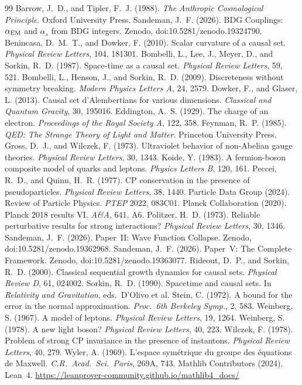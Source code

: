 \documentclass[12pt,a4paper]{article}
\begin{document}

\begin{thebibliography}{99}
 Barrow, J.~D., and Tipler, F.~J. (1988). \textit{The Anthropic Cosmological Principle}. Oxford University Press.
 Sandeman, J.~F. (2026). BDG Couplings: $\alpha_{\rm EM}$ and $\alpha_s$ from BDG integers. Zenodo, doi:10.5281/zenodo.19324790.
 Benincasa, D.~M.~T., and Dowker, F. (2010). Scalar curvature of a causal set. \textit{Physical Review Letters}, 104, 181301.
 Bombelli, L., Lee, J., Meyer, D., and Sorkin, R.~D. (1987). Space-time as a causal set. \textit{Physical Review Letters}, 59, 521.
 Bombelli, L., Henson, J., and Sorkin, R.~D. (2009). Discreteness without symmetry breaking. \textit{Modern Physics Letters A}, 24, 2579.
 Dowker, F., and Glaser, L. (2013). Causal set d'Alembertians for various dimensions. \textit{Classical and Quantum Gravity}, 30, 195016.
 Eddington, A.~S. (1929). The charge of an electron. \textit{Proceedings of the Royal Society A}, 122, 358.
 Feynman, R.~P. (1985). \textit{QED: The Strange Theory of Light and Matter}. Princeton University Press.
 Gross, D.~J., and Wilczek, F. (1973). Ultraviolet behavior of non-Abelian gauge theories. \textit{Physical Review Letters}, 30, 1343.
 Koide, Y. (1983). A fermion-boson composite model of quarks and leptons. \textit{Physics Letters B}, 120, 161.
 Peccei, R.~D., and Quinn, H.~R. (1977). CP conservation in the presence of pseudoparticles. \textit{Physical Review Letters}, 38, 1440.
 Particle Data Group (2024). Review of Particle Physics. \textit{PTEP} 2022, 083C01.
 Planck Collaboration (2020). Planck 2018 results VI. \textit{A\&A}, 641, A6.
 Politzer, H.~D. (1973). Reliable perturbative results for strong interactions? \textit{Physical Review Letters}, 30, 1346.
 Sandeman, J.~F. (2026). Paper~II: Wave Function Collapse. Zenodo, doi:10.5281/zenodo.19362968.
 Sandeman, J.~F. (2026). Paper~V: The Complete Framework. Zenodo, doi:10.5281/zenodo.19363077.
 Rideout, D.~P., and Sorkin, R.~D. (2000). Classical sequential growth dynamics for causal sets. \textit{Physical Review D}, 61, 024002.
 Sorkin, R.~D. (1990). Spacetime and causal sets. In \textit{Relativity and Gravitation}, eds.\ D'Olivo et al.
 Stein, C. (1972). A bound for the error in the normal approximation. \textit{Proc.\ 6th Berkeley Symp.}, 2, 583.
 Weinberg, S. (1967). A model of leptons. \textit{Physical Review Letters}, 19, 1264.
 Weinberg, S. (1978). A new light boson? \textit{Physical Review Letters}, 40, 223.
 Wilczek, F. (1978). Problem of strong CP invariance in the presence of instantons. \textit{Physical Review Letters}, 40, 279.
 Wyler, A. (1969). L'espace sym\'etrique du groupe des \'equations de Maxwell. \textit{C.R.\ Acad.\ Sci.\ Paris}, 269A, 743.
 Mathlib Contributors (2024). Lean~4. \url{https://leanprover-community.github.io/mathlib4_docs/}
\end{thebibliography}
\end{document}
